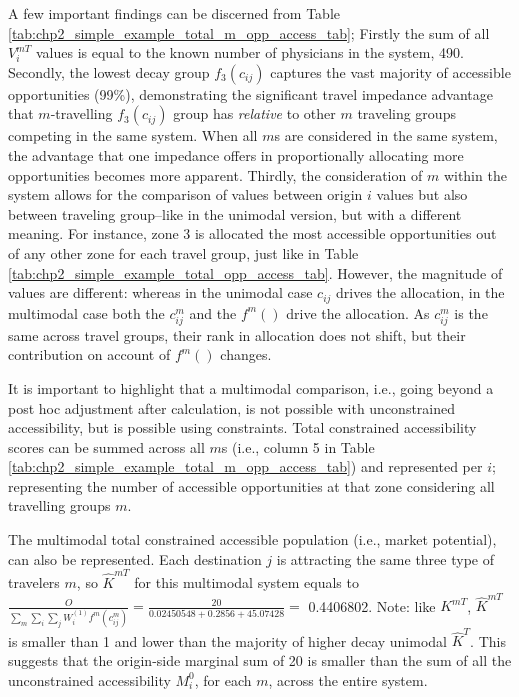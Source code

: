 \documentclass[
11pt, %
oneside, %
english, %
singlespacing, %
]{macthesis} %
\begin{document}


A few important findings can be discerned from Table \ref{tab:chp2_simple_example_total_m_opp_access_tab}; Firstly the sum of all \(V_i^{mT}\) values is equal to the known number of physicians in the system, 490. Secondly, the lowest decay group \(f_3(c_{ij})\) captures the vast majority of accessible opportunities (99\%), demonstrating the significant travel impedance advantage that \(m\)-travelling \(f_3(c_{ij})\) group has \emph{relative} to other \(m\) traveling groups competing in the same system. When all \(m\)s are considered in the same system, the advantage that one impedance offers in proportionally allocating more opportunities becomes more apparent. Thirdly, the consideration of \(m\) within the system allows for the comparison of values between origin \(i\) values but also between traveling group--like in the unimodal version, but with a different meaning. For instance, zone 3 is allocated the most accessible opportunities out of any other zone for each travel group, just like in Table \ref{tab:chp2_simple_example_total_opp_access_tab}. However, the magnitude of values are different: whereas in the unimodal case \(c_{ij}\) drives the allocation, in the multimodal case both the \(c^m_{ij}\) and the \(f^m()\) drive the allocation. As \(c^m_{ij}\) is the same across travel groups, their rank in allocation does not shift, but their contribution on account of \(f^m()\) changes.

It is important to highlight that a multimodal comparison, i.e., going beyond a post hoc adjustment after calculation, is not possible with unconstrained accessibility, but is possible using constraints. Total constrained accessibility scores can be summed across all \(m\)s (i.e., column 5 in Table \ref{tab:chp2_simple_example_total_m_opp_access_tab}) and represented per \(i\); representing the number of accessible opportunities at that zone considering all travelling groups \(m\).

The multimodal total constrained accessible population (i.e., market potential), can also be represented. Each destination \(j\) is attracting the same three type of travelers \(m\), so \(\hat K^{mT}\) for this multimodal system equals to \(\frac{O}{\sum_m\sum_i\sum_j W^{(1)}_i f^m(c^m_{ij})} = \frac{20}{0.02450548 + 0.2856 + 45.07428}=\) 0.4406802. Note: like \(K^{mT}\), \(\hat K^{mT}\) is smaller than 1 and lower than the majority of higher decay unimodal \(\hat K^T\). This suggests that the origin-side marginal sum of 20 is smaller than the sum of all the unconstrained accessibility \(M^{0}_i\), for each \(m\), across the entire system.
\end{document}
